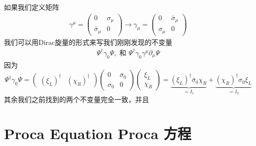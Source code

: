 如果我们定义矩阵
\begin{align}
\gamma^\mu=\left(\begin{matrix}0&\sigma_\mu\\\bar\sigma_\mu&0\end{matrix}\right)\to\gamma_\mu=\left(\begin{matrix}0&\bar\sigma_\mu\\\sigma_\mu&0\end{matrix}\right)
\end{align}
我们可以用Dirac旋量的形式来写我们刚刚发现的不变量
\begin{align}
\Psi^\dagger\gamma_0\Psi,\text{\ \ 和\ \ }\Psi^\dagger\gamma_0\gamma^\mu\partial_\mu\Psi
\end{align}
因为
\[\Psi^\dagger\gamma_0\Psi=\left(\begin{matrix}(\xi_L)^\dagger&(\chi_R)^\dagger\end{matrix}\right) \left(\begin{matrix}0&\bar\sigma_0\\\sigma_0&0\end{matrix}\right) \left(\begin{matrix}\xi_L\\\chi_R\end{matrix}\right) = \underbrace{(\xi_L)^\dagger\bar\sigma_0\chi_R}_{=I_1}+\underbrace{(\chi_R)^\dagger\sigma_0\xi_L}_{=I_2} \]
其余我们之前找到的两个不变量完全一致，并且


\section[Proca方程]{Proca Equation Proca 方程}\label{sec6.4}








